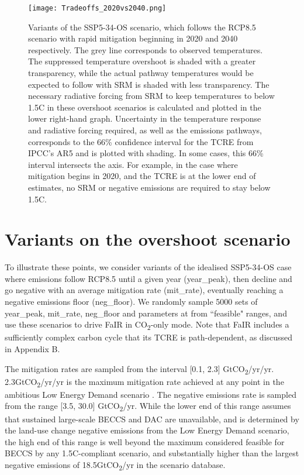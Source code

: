 \documentclass[draft]{agujournal2019}
\begin{document}
\begin{figure}[!h]
  \texttt{[image: Tradeoffs\_2020vs2040.png]}
  \caption{Variants of the SSP5-34-OS scenario, which follows the RCP8.5 scenario with rapid mitigation beginning in 2020 and 2040 respectively. The grey line corresponds to observed temperatures. The suppressed temperature overshoot is shaded with a greater transparency, while the actual pathway temperatures would be expected to follow with SRM is shaded with less transparency. The necessary radiative forcing from SRM to keep temperatures to below 1.5C in these overshoot scenarios is calculated and plotted in the lower right-hand graph. Uncertainty in the temperature response and radiative forcing required, as well as the emissions pathways, corresponds to the 66\% confidence interval for the TCRE from IPCC's AR5 and is plotted with shading. In some cases, this 66\% interval intersects the axis. For example, in the case where mitigation begins in 2020, and the TCRE is at the lower end of estimates, no SRM or negative emissions are required to stay below 1.5C.}
  \label{fig:2020vs2040_SRM.png}
\end{figure}


\newpage





\section{Variants on the overshoot scenario}

To illustrate these points, we consider variants of the idealised SSP5-34-OS case where emissions follow RCP8.5 until a given year (year\_peak), then decline and go negative with an average mitigation rate (mit\_rate), eventually reaching a negative emissions floor (neg\_floor). We randomly sample 5000 sets of year\_peak, mit\_rate, neg\_floor and parameters at from ``feasible" ranges, and use these scenarios to drive FaIR in CO\textsubscript{2}-only mode.  Note that FaIR includes a sufficiently complex carbon cycle that its TCRE is path-dependent, as discussed in Appendix B. %

\medskip

The mitigation rates are sampled from the interval [0.1, 2.3] GtCO\textsubscript{2}/yr/yr. 2.3GtCO\textsubscript{2}/yr/yr is the maximum mitigation rate achieved at any point in the ambitious Low Energy Demand scenario \cite{grubler2018low}. The negative emissions rate is sampled from the range [3.5, 30.0] GtCO\textsubscript{2}/yr. While the lower end of this range assumes that sustained large-scale BECCS and DAC are unavailable, and is determined by the land-use change negative emissions from the Low Energy Demand scenario, the high end of this range is well beyond the maximum considered feasible for BECCS by any 1.5C-compliant scenario, and substantially higher than the largest negative emissions of 18.5GtCO\textsubscript{2}/yr in the scenario database. 
\end{document}
